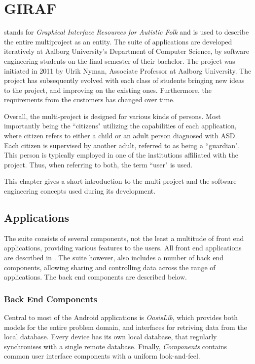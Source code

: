 \chapter{GIRAF}\label{chap:giraf}
\giraf  stands for \textit{Graphical Interface Resources for Autistic Folk} and is used to describe the entire multiproject as an entity.
The suite of \giraf applications are developed iteratively at Aalborg University's Department of Computer Science, by software engineering students on the final semester of their bachelor.
The project was initiated in 2011 by Ulrik Nyman, Associate Professor at Aalborg University.
The project has subsequently evolved with each class of students bringing new ideas to the project, and improving on the existing ones.
Furthermore, the requirements from the customers has changed over time.

Overall, the multi-project is designed for various kinds of persons.
Most importantly being the ``citizens" utilizing the capabilities of each application, where citizen refers to either a child or an adult person diagnosed with ASD.
Each citizen is supervised by another adult, referred to as being a ``guardian".
This person is typically employed in one of the institutions affiliated with the \giraf project.
Thus, when referring to both, the term ``user" is used.

This chapter gives a short introduction to the \giraf multi-project and the software engineering concepts used during its development.

\section{\giraf Applications}\label{sec:giraf:applications}
The \giraf suite consists of several components, not the least a multitude of front end applications, providing various features to the users. All front end applications are described in . 
The suite however, also includes a number of back end components, allowing sharing and controlling data across the range of applications. 
The back end components are described below.

\subsection{Back End Components}
\label{sec:giraf:applications:backend}
Central to most of the Android applications is \textit{OasisLib}, which provides both models for the entire problem domain, and interfaces for retriving data from the local database. Every device has its own local database, that regularly synchronises with a single remote database. Finally, \textit{\giraf Components} contains common user interface components with a uniform look-and-feel. 

